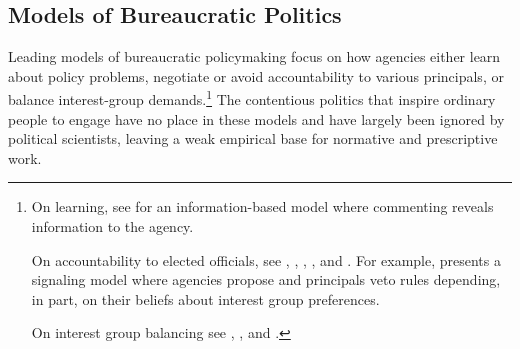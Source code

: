 \subsection{Models of Bureaucratic Politics} 
Leading models of bureaucratic policymaking focus on how agencies either learn about policy problems, negotiate or avoid accountability to various principals, or balance interest-group demands.\footnote{
On learning, see \citet{Libgober2018} for an information-based model where commenting reveals information to the agency. 

On accountability to elected officials, see  \citet{Furlong1997}, \citet{Nou2016}, \citet{Potter2016}, \citet{Woods2018}, and \citet{Yackee2009RegGov}. For example, \citet{Potter2014dis} presents a signaling model where agencies propose and principals veto rules depending, in part, on their beliefs about interest group preferences. 

On interest group balancing see \citet{Yackee2006JOP},  \citet{Yackee2006JPART}, and \citet{Kerwin2011}.
} 
The contentious politics that inspire ordinary people to engage have no place in these models and have largely been ignored by political scientists, leaving a weak empirical base for normative and prescriptive work.

